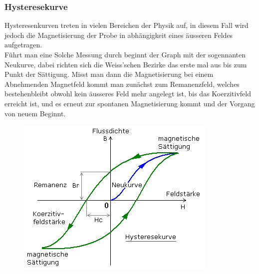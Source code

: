         \subsubsection*{Hysteresekurve}
            Hysteresenkurven treten in vielen Bereichen der Physik auf, in diesem Fall wird jedoch die Magnetisierung
            der Probe in abhängigkeit eines äusseren Feldes aufgetragen.\\
            Führt man eine Solche Messung durch beginnt der Graph mit der sogennanten Neukurve, dabei richten sich
            die Weiss'schen Bezirke das erste mal aus bis zum Punkt der Sättigung. Misst man dann die Magnetisierung bei einem Abnehmenden Magnetfeld
            kommt man zunächst zum Remanenzfeld, welches bestehenbleibt obwohl kein äusseres Feld mehr angelegt ist, bis 
            das Koerzitivfeld erreicht ist, und es erneut zur spontanen Magnetisierung kommt und der Vorgang von neuem Beginnt.
            \begin{figure}[H]
                \centering
                \includegraphics{Images/hyster.png}
            \end{figure}
